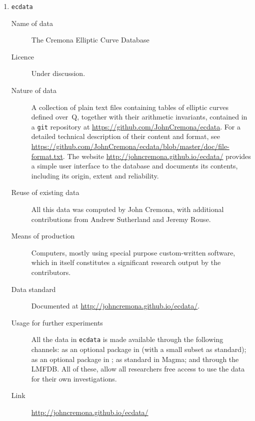 \documentclass{../../Proposal/LaTeX-proposal/deliverablereport}
\begin{document}
\begin{enumerate}
\item{{\tt ecdata}}
\begin{description}
\item[Name of data] The Cremona Elliptic Curve Database
\item[Licence]  Under discussion.
\item[Nature of data] A collection of plain text files containing tables of elliptic curves defined over~Q, together with their arithmetic invariants, contained in a {\tt git} repository at  \url{https://github.com/JohnCremona/ecdata}.  For a detailed technical description of their content and format, see  \url{https://github.com/JohnCremona/ecdata/blob/master/doc/file-format.txt}. The website  \url{http://johncremona.github.io/ecdata/} provides a simple user interface to the database and documents its contents, including its origin, extent and reliability.
\item[Reuse of existing data] All this data was computed by John Cremona, with additional contributions from Andrew Sutherland and Jeremy Rouse.
\item[Means of production] Computers, mostly using special purpose custom-written software, which in itself constitutes a significant research output by the contributors.
\item[Data standard] Documented at \url{http://johncremona.github.io/ecdata/}.
\item [Usage for further experiments] All the data in {\tt ecdata} is made available through the following channels: as an optional package in \Sage (with a small subset as standard); as an optional package in \PariGP; as standard in Magma; and through the LMFDB.  All of these, allow all researchers free access to use the data for their own investigations.
\item [Link] \url{http://johncremona.github.io/ecdata/}
\end{description}


\end{enumerate}
\end{document}
